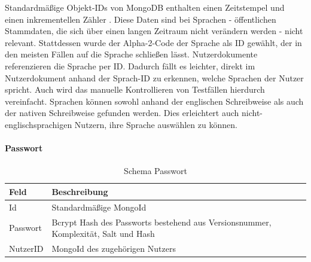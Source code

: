 Standardmäßige Objekt-IDs von MongoDB enthalten einen Zeitstempel und einen inkrementellen Zähler \cite{db:mongoObjectId}.
 Diese Daten sind bei Sprachen - öffentlichen Stammdaten, die sich über einen langen Zeitraum nicht verändern werden - nicht relevant.
Stattdessen wurde der Alpha-2-Code der Sprache als ID gewählt, der in den meisten Fällen auf die Sprache schließen lässt.
Nutzerdokumente referenzieren die Sprache per ID.
Dadurch fällt es leichter, direkt im Nutzerdokument anhand der Sprach-ID zu erkennen, welche Sprachen der Nutzer spricht.
Auch wird das manuelle Kontrollieren von Testfällen hierdurch vereinfacht.
Sprachen können sowohl anhand der englischen Schreibweise als auch der nativen Schreibweise gefunden werden.
Dies erleichtert auch nicht-englischsprachigen Nutzern, ihre Sprache auswählen zu können.

\paragraph{Passwort\\}
\begin{table}
    \centering
    \begin{tabularx}{\textwidth}{ |X|X| }
        \hline
        Feld & Beschreibung  \\
        \hline
        Id & Standardmäßige MongoId \\
        Passwort & Bcrypt Hash des Passworts bestehend aus Versionsnummer, Komplexität, Salt und Hash \\
        NutzerID & MongoId des zugehörigen Nutzers \\
        \hline
    \end{tabularx}
    \caption{Schema Passwort}
    \label{db:table:passwort}
\end{table}

